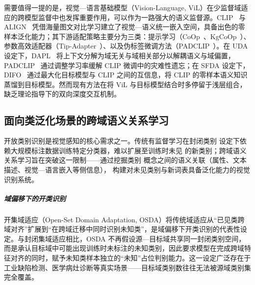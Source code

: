 需要值得一提的是，视觉—语言基础模型（Vision-Language, ViL）在少监督域适应的跨模型监督中也发挥重要作用，可以作为一路强大的语义监督源。CLIP~\cite{radford2021learning} 与 ALIGN~\cite{jia2021scaling} 凭借海量图文对比学习建立了视觉—语义统一嵌入空间，具备出色的零样本泛化能力；其下游适配策略主要分为三类：提示学习（CoOp~\cite{zhou2022learning}、KgCoOp~\cite{kgcoop}）、参数高效适配器（Tip-Adapter~\cite{Tip-Adapter}）、以及伪标签微调方法（PADCLIP~\cite{lai2023padclip}）。在 UDA 设定下，DAPL~\cite{ge2023domain} 将上下文分解为域无关与域相关部分以解耦语义与域偏置，PADCLIP~\cite{lai2023padclip} 通过调整学习率缓解 CLIP 微调中的灾难性遗忘；在 SFDA 设定下，DIFO~\cite{tang2024source} 通过最大化目标模型与 CLIP 之间的互信息，将 CLIP 的零样本语义知识蒸馏到目标模型。然而现有方法在将 ViL 与目标模型结合时多停留于浅层组合，缺乏理论指导下的双向深度交互机制。


\subsection{面向类泛化场景的跨域语义关系学习}

开放类别识别是视觉感知的核心需求之一。传统有监督学习在封闭类别 设定下依赖大规模标注数据训练特定分类器，难以扩展至训练时未见 的新类别；跨域语义关系学习旨在突破这一限制——通过挖掘类别 概念之间的语义关联（属性、文本描述、视觉—语言嵌入等侧信息）， 构建对未见类别与新词表具备泛化能力的视觉识别系统。


\subparagraph{域偏移下的开类识别}

开集域适应（Open-Set Domain Adaptation, OSDA）将传统域适应从“已见类跨域对齐”扩展到“在跨域迁移中同时识别未知类”，是域偏移下开类识别的代表性设定。与封闭集域适应相比，OSDA 不再假设源—目标域共享同一封闭类别空间，而是承认目标域中可能出现训练时未标注的未知类别，因此要求模型在完成跨域特征对齐的同时，赋予未知类样本独立的“未知”占位判别能力。这一设定广泛存在于工业缺陷检测、医学病灶诊断等真实场景——目标域类别数往往无法被源域类别集完全覆盖。

